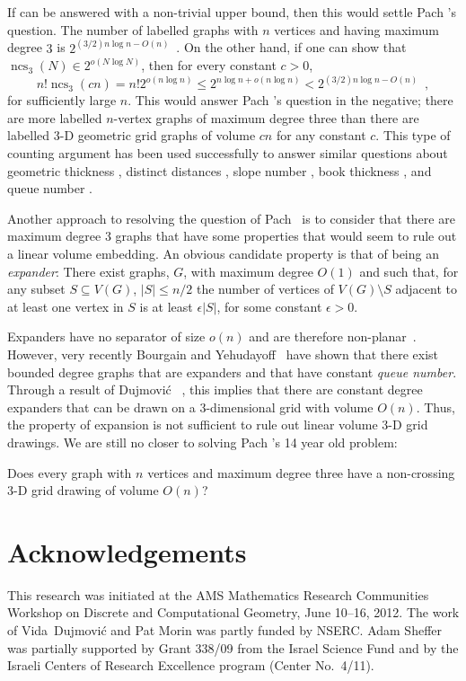 \documentclass{patmorin}
\newcommand{\n}{N}
\DeclareMathOperator{\ncs}{ncs}
\begin{document}
If  can be answered with a  non-trivial upper bound,
then this would settle Pach \etal's question.  The number of labelled
graphs with $n$ vertices and having maximum degree $3$ is $2^{(3/2)n\log
n - O(n)}$~\cite[Appendix~A]{barat.matousek.ea:bounded-degree}. On the
other hand, if one can show that $\ncs_3(\n)\in 2^{o(\n\log\n)}$, then
for every constant $c>0$,
\[
   n!\ncs_3(cn) = n!2^{o(n\log n)} \le 2^{n\log n + o(n\log n)}
   < 2^{(3/2)n\log n - O(n)} \enspace ,
\]
for sufficiently large $n$. This would answer Pach \etal's question
in the negative; there are more labelled $n$-vertex graphs of
maximum degree three than there are labelled 3-D geometric grid
graphs of volume $cn$ for any constant $c$.   This type of counting
argument has been used successfully to answer similar questions
about geometric thickness \cite{barat.matousek.ea:bounded-degree},
distinct distances \cite{carmi.dujmovic.ea:distinct}, slope number
\cite{pach.palvolgyi:bounded}, book thickness \cite{malitz:graphs},
and queue number \cite{malitz:graphs,wood:bounded}.

Another approach to resolving the question of Pach \etal\ is to consider
that there are maximum degree 3 graphs that have some properties that
would seem to rule out a linear volume embedding.  An obvious candidate
property is that of being an \emph{expander}: There exist graphs, $G$,
with maximum degree $O(1)$ and such that, for any subset $S\subseteq
V(G)$, $|S|\le n/2$ the number of vertices of $V(G)\setminus S$ adjacent
to at least one vertex in $S$ is at least $\epsilon|S|$, for some constant
$\epsilon > 0$.

Expanders have no separator of size $o(n)$ and are therefore
non-planar~\cite{lipton.tarjan:separator}.  However, very recently
Bourgain and Yehudayoff~\cite{bourgain.yehudayoff:monotone} have
shown that there exist bounded degree graphs that are expanders and
that have constant \emph{queue number}. Through a result of Dujmovi\'c
\etal~\cite[Theorem~8]{dujmovic.por.ea:track}, this implies that there
are constant degree expanders that can be drawn on a 3-dimensional grid
with volume $O(n)$. Thus, the property of expansion is not sufficient
to rule out linear volume 3-D grid drawings.  We are still no closer
to solving Pach \etal's 14 year old problem:

\begin{op}
  Does every graph with $n$ vertices and maximum degree three have a
  non-crossing 3-D grid drawing of volume $O(n)$?
\end{op}


\section*{Acknowledgements}

This research was initiated at the AMS Mathematics Research Communities
Workshop on Discrete and Computational Geometry, June 10--16, 2012.
The work of Vida~Dujmovi\'c and Pat Morin was partly funded by NSERC.
Adam Sheffer was partially supported by Grant 338/09 from the Israel
Science Fund and by the Israeli Centers of Research Excellence program
(Center No.~4/11).



\end{document}
